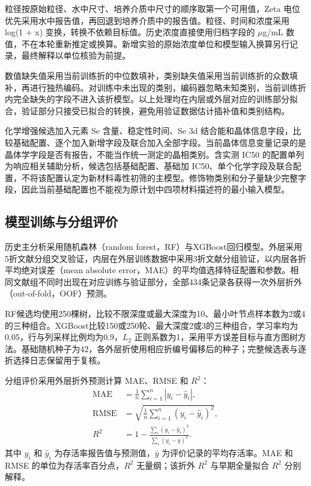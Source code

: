 粒径按原始粒径、水中尺寸、培养介质中尺寸的顺序取第一个可用值，Zeta 电位优先采用水中报告值，再回退到培养介质中的报告值。粒径、时间和浓度采用 log(1 + x) 变换，转换不依赖目标值。历史浓度直接使用归档字段的 \ensuremath{\mu}g/mL 数值，不在本轮重新推定或换算。新增实验的原始浓度单位和模型输入换算另行记录，最终解释以单位核验为前提。

数值缺失值采用当前训练折的中位数填补，类别缺失值采用当前训练折的众数填补，再进行独热编码。对训练中未出现的类别，编码器忽略未知类别，当前训练折内完全缺失的字段不进入该折模型。以上处理均在内层或外层对应的训练部分拟合，验证部分只接受已拟合的转换，避免用验证数据估计插补值和类别结构。

化学增强候选加入元素 Se 含量、稳定性时间、Se 3d 结合能和晶体信息字段，比较基础配置、逐个加入新增字段及联合加入全部字段。当前晶体信息变量记录的是晶体学字段是否有报告，不能当作统一测定的晶相类别。含实测 IC50 的配置单列为响应相关辅助分析，候选包括基础配置、基础加 IC50、单个化学字段及联合配置，不将该配置认定为新材料毒性初筛的主模型。修饰物类别和分子量缺少完整字段，因此当前基础配置也不能视为原计划中四项材料描述符的最小输入模型。

\subsection{模型训练与分组评价}

历史主分析采用随机森林（random forest，RF）\cite{breiman2001random}与XGBoost\cite{chen2016xgboost}回归模型。外层采用5折文献分组交叉验证，内层在外层训练数据中采用3折文献分组验证，以内层各折平均绝对误差（mean absolute error，MAE）的平均值选择特征配置和参数。相同文献组不同时出现在对应训练与验证部分，全部434条记录各获得一次外层折外（out-of-fold，OOF）预测。

RF候选均使用250棵树，比较不限深度或最大深度为10、最小叶节点样本数为2或4的三种组合。XGBoost比较150或250轮、最大深度2或3的三种组合，学习率均为0.05，行与列采样比例均为0.9，$L_2$ 正则系数为1，采用平方误差目标与直方图树方法。基础随机种子为42，各外层折使用相应折编号偏移后的种子；完整候选表与逐折选择日志保留用于复核。

分组评价采用外层折外预测计算 MAE、RMSE 和 $R^2$：
\begin{align}
\mathrm{MAE}&=\frac{1}{n}\sum_{i=1}^{n}|y_i-\hat y_i|,\\
\mathrm{RMSE}&=\sqrt{\frac{1}{n}\sum_{i=1}^{n}(y_i-\hat y_i)^2},\\
R^2&=1-\frac{\sum_i(y_i-\hat y_i)^2}{\sum_i(y_i-\bar y)^2}.
\end{align}
其中 $y_i$ 和 $\hat y_i$ 为存活率报告值与预测值，$\bar y$ 为评价记录的平均存活率。MAE 和 RMSE 的单位为存活率百分点，$R^2$ 无量纲；该折外 $R^2$ 与早期全量拟合 $R^2$ 分别解释。

